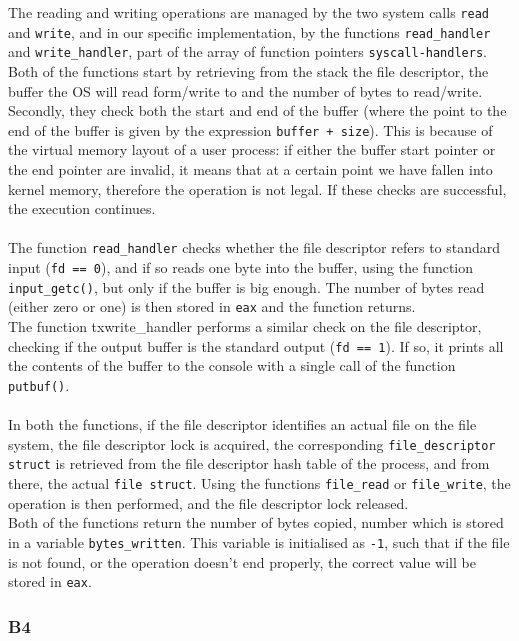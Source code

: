 \documentclass[a4wide, 11pt]{article}
\newcommand{\tx}{\texttt}
\begin{document}
The reading and writing operations are managed by the two system calls \tx{read} and \tx{write}, and in our specific implementation, by the functions \tx{read\_handler} and \tx{write\_handler}, part of the array of function pointers \tx{syscall-handlers}. 
\\
Both of the functions start by retrieving from the stack the file descriptor, the buffer the OS will read form/write to and the number of bytes to read/write. Secondly, they check both the start and end of the buffer (where the point to the end of the buffer is given by the expression \tx{buffer + size}). This is because of the virtual memory layout of a user process: if either the buffer start pointer or the end pointer are invalid, it means that at a certain point we have fallen into kernel memory, therefore the operation is not legal. If these checks are successful, the execution continues.  \\\\
The function \tx{read\_handler} checks whether the file descriptor refers to standard input (\tx{fd == 0}), and if so reads one byte into the buffer, using the function \tx{input\_getc()}, but only if the buffer is big enough. The number of bytes read (either zero or one) is then stored in \tx{eax} and the function returns.
\\
The function tx{write\_handler} performs a similar check on the file descriptor, checking if the output buffer is the standard output (\tx{fd == 1}). If so, it prints all the contents of the buffer to the console with a single call of the function \tx{putbuf()}.\\\\
In both the functions, if the file descriptor identifies an actual file on the file system, the file descriptor lock is acquired, the corresponding \tx{file\_descriptor struct} is retrieved from the file descriptor hash table of the process, and from there, the actual \tx{file struct}. Using the functions \tx{file\_read} or \tx{file\_write}, the operation is then performed, and the file descriptor lock released.\\
Both of the functions return the number of bytes copied, number which is stored in a variable \tx{bytes\_written}. This variable is initialised as \tx{-1}, such that if the file is not found, or the operation doesn't end properly, the correct value will be stored in \tx{eax}.


\subsubsection{B4}
\end{document}
